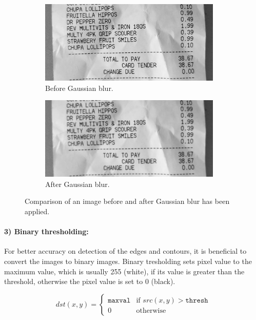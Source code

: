 \documentclass[
  digital, %
  table,   %
  oneside, %
  lof,     %
  lot,     %
]{fithesis3}
\newcommand\half{0.45}
\newcommand\subfigsize{0.95}
\begin{document}
\begin{figure}
    \centering
    \begin{subfigure}[t]{\half\textwidth}
      \centering
      \includegraphics[width=\subfigsize\textwidth]{figures/image_processing/before_blur}
      \caption{Before Gaussian blur.}
    \end{subfigure}
    \begin{subfigure}[t]{\half\textwidth}
      \centering
      \includegraphics[width=\subfigsize\textwidth]{figures/image_processing/after_blur}
      \caption{After Gaussian blur.}
    \end{subfigure}
    \caption{Comparison of an image before and after Gaussian blur has been applied.}
    \label{fig:gaussian_blur}
\end{figure}

\paragraph{3) Binary thresholding:} For better accuracy on detection of the edges and contours, it is beneficial to convert the images to binary images. Binary tresholding sets pixel value to the maximum value, which is usually 255 (white), if its value is greater than the threshold, otherwise the pixel value is set to 0 (black).

\begin{equation}
\label{eqn:binary_tresholding}
dst(x,y) = \begin{cases}
            \texttt{maxval} & \text{if }src(x,y) > \texttt{thresh}\\
                0 & \text{otherwise}
          \end{cases}
\end{equation}
\end{document}
